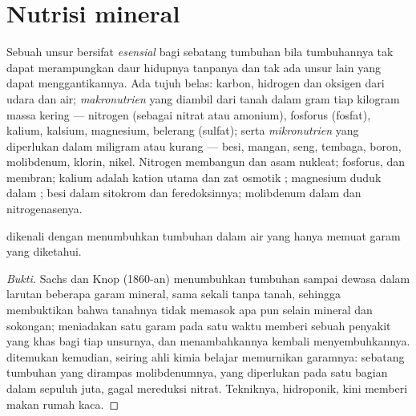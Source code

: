 \section{Nutrisi mineral}

\begin{definition}\label{def:b1:plant-water-minerals:elements}
Sebuah unsur bersifat \emph{esensial} bagi sebatang tumbuhan bila
tumbuhannya tak dapat merampungkan daur hidupnya tanpanya dan tak ada
unsur lain yang dapat menggantikannya. Ada tujuh belas: karbon,
hidrogen dan oksigen dari udara dan air; \emph{makronutrien} yang
diambil dari tanah dalam gram tiap kilogram massa kering --- nitrogen
(sebagai nitrat atau amonium), fosforus (fosfat), kalium, kalsium,
magnesium, belerang (sulfat); serta \emph{mikronutrien} yang
diperlukan dalam miligram atau kurang --- besi, mangan, seng, tembaga,
boron, molibdenum, klorin, nikel. Nitrogen membangun  dan asam
nukleat; fosforus,  dan membran; kalium adalah kation utama
 dan zat osmotik ; magnesium duduk dalam ;
besi dalam sitokrom dan feredoksinnya; molibdenum dalam  dan nitrogenasenya.
\end{definition}

\begin{proposition}\label{prop:b1:plant-water-minerals:hydroponics}
 dikenali dengan menumbuhkan tumbuhan dalam air yang
hanya memuat garam yang diketahui.
\end{proposition}
\begin{proof}[Bukti]
Sachs dan Knop (1860-an) menumbuhkan tumbuhan sampai dewasa dalam
larutan beberapa garam mineral, sama sekali tanpa tanah, sehingga
membuktikan bahwa tanahnya tidak memasok apa pun selain mineral dan
sokongan; meniadakan satu garam pada satu waktu memberi sebuah
penyakit yang khas bagi tiap unsurnya, dan menambahkannya kembali
menyembuhkannya.  ditemukan kemudian, seiring ahli
kimia belajar memurnikan garamnya: sebatang tumbuhan yang dirampas
molibdenumnya, yang diperlukan pada satu bagian dalam sepuluh juta,
gagal mereduksi nitrat. Tekniknya, hidroponik, kini memberi makan
rumah kaca.
\end{proof}


